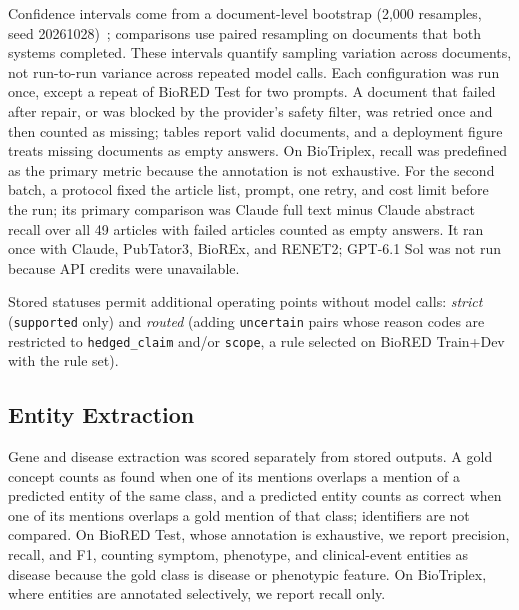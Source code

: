 \documentclass[preprint,10pt,letterpaper]{elsarticle}
\newcommand{\st}[1]{\texttt{#1}}             %
\begin{document}
Confidence intervals come from a document-level bootstrap (2,000 resamples, seed 20261028)~\cite{efron1993bootstrap}; comparisons use paired resampling on documents that both systems completed. These intervals quantify sampling variation across documents, not run-to-run variance across repeated model calls. Each configuration was run once, except a repeat of BioRED Test for two prompts. A document that failed after repair, or was blocked by the provider's safety filter, was retried once and then counted as missing; tables report valid documents, and a deployment figure treats missing documents as empty answers. On BioTriplex, recall was predefined as the primary metric because the annotation is not exhaustive. For the second batch, a protocol fixed the article list, prompt, one retry, and cost limit before the run; its primary comparison was Claude full text minus Claude abstract recall over all 49 articles with failed articles counted as empty answers. It ran once with Claude, PubTator3, BioREx, and RENET2; GPT-6.1 Sol was not run because API credits were unavailable.

Stored statuses permit additional operating points without model calls: \emph{strict} (\st{supported} only) and \emph{routed} (adding \st{uncertain} pairs whose reason codes are restricted to \st{hedged\_claim} and/or \st{scope}, a rule selected on BioRED Train+Dev with the rule set).

\subsection{Entity Extraction}
Gene and disease extraction was scored separately from stored outputs. A gold concept counts as found when one of its mentions overlaps a mention of a predicted entity of the same class, and a predicted entity counts as correct when one of its mentions overlaps a gold mention of that class; identifiers are not compared. On BioRED Test, whose annotation is exhaustive, we report precision, recall, and F1, counting symptom, phenotype, and clinical-event entities as disease because the gold class is disease or phenotypic feature. On BioTriplex, where entities are annotated selectively, we report recall only.
\end{document}
